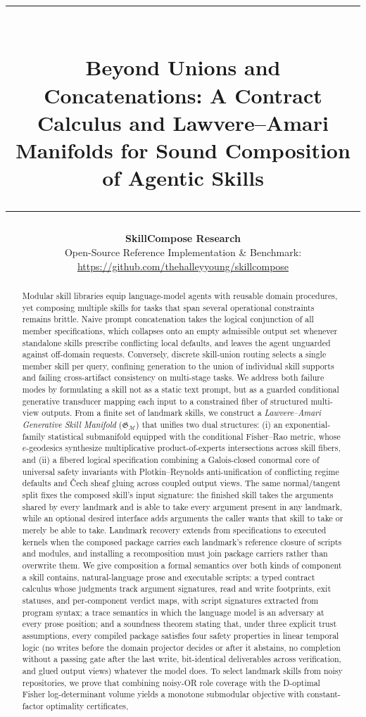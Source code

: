 \documentclass[11pt]{article}
\title{%
  \vspace{-1.2em}
  \rule{0.94\textwidth}{1.5pt}\\[0.55em]
  {\LARGE\bfseries Beyond Unions and Concatenations: A Contract Calculus and Lawvere--Amari Manifolds for Sound Composition of Agentic Skills}\\[0.45em]
  \rule{0.94\textwidth}{0.7pt}
}
\author{%
  \textbf{SkillCompose Research}\\[0.25em]
  {\small Open-Source Reference Implementation \& Benchmark:}\\[0.1em]
  {\small \url{https://github.com/thehalleyyoung/skillcompose}}
}
\date{}
\theoremstyle{definition}
\theoremstyle{plain}
\newcommand{\Mcal}{\mathcal{M}}
\newcommand{\Gfrak}{\mathfrak{G}}
\begin{document}
\maketitle

\begin{abstract}
\noindent
Modular skill libraries equip language-model agents with reusable domain procedures, yet composing multiple skills for tasks that span several operational constraints remains brittle. Naive prompt concatenation takes the logical conjunction of all member specifications, which collapses onto an empty admissible output set whenever standalone skills prescribe conflicting local defaults, and leaves the agent unguarded against off-domain requests. Conversely, discrete skill-union routing selects a single member skill per query, confining generation to the union of individual skill supports and failing cross-artifact consistency on multi-stage tasks. We address both failure modes by formulating a skill not as a static text prompt, but as a guarded conditional generative transducer mapping each input to a constrained fiber of structured multi-view outputs. From a finite set of landmark skills, we construct a \emph{Lawvere--Amari Generative Skill Manifold} ($\Gfrak_{\Mcal}$) that unifies two dual structures: (i) an exponential-family statistical submanifold equipped with the conditional Fisher--Rao metric, whose $e$-geodesics synthesize multiplicative product-of-experts intersections across skill fibers, and (ii) a fibered logical specification combining a Galois-closed conormal core of universal safety invariants with Plotkin--Reynolds anti-unification of conflicting regime defaults and \v{C}ech sheaf gluing across coupled output views. The same normal/tangent split fixes the composed skill's input signature: the finished skill takes the arguments shared by every landmark and is able to take every argument present in any landmark, while an optional desired interface adds arguments the caller wants that skill to take or merely be able to take. Landmark recovery extends from specifications to executed kernels when the composed package carries each landmark's reference closure of scripts and modules, and installing a recomposition must join package carriers rather than overwrite them. We give composition a formal semantics over both kinds of component a skill contains, natural-language prose and executable scripts: a typed contract calculus whose judgments track argument signatures, read and write footprints, exit statuses, and per-component verdict maps, with script signatures extracted from program syntax; a trace semantics in which the language model is an adversary at every prose position; and a soundness theorem stating that, under three explicit trust assumptions, every compiled package satisfies four safety properties in linear temporal logic (no writes before the domain projector decides or after it abstains, no completion without a passing gate after the last write, bit-identical deliverables across verification, and glued output views) whatever the model does. To select landmark skills from noisy repositories, we prove that combining noisy-OR role coverage with the D-optimal Fisher log-determinant volume yields a monotone submodular objective with constant-factor optimality certificates, 
\end{abstract}
\end{document}
